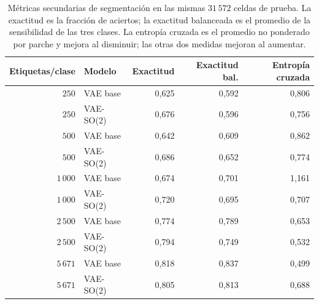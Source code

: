 \begin{table}[htbp]
    \centering
    \caption[Métricas secundarias de segmentación por presupuesto.]{Métricas secundarias de segmentación en las mismas \(31\,572\) celdas de prueba. La exactitud es la fracción de aciertos; la exactitud balanceada es el promedio de la sensibilidad de las tres clases. La entropía cruzada es el promedio no ponderado por parche y mejora al disminuir; las otras dos medidas mejoran al aumentar.}
    \label{tab:tejido-metricas-secundarias}
    \small
    \begin{tabular}{@{}rlrrr@{}}
        \toprule
        Etiquetas/clase & Modelo & Exactitud & Exactitud bal. & Entropía cruzada \\
        \midrule
        \(250\) & VAE base & 0,625 & 0,592 & 0,806 \\
        \(250\) & VAE-SO(2) & 0,676 & 0,596 & 0,756 \\
        \(500\) & VAE base & 0,642 & 0,609 & 0,862 \\
        \(500\) & VAE-SO(2) & 0,686 & 0,652 & 0,774 \\
        \(1\,000\) & VAE base & 0,674 & 0,701 & 1,161 \\
        \(1\,000\) & VAE-SO(2) & 0,720 & 0,695 & 0,707 \\
        \(2\,500\) & VAE base & 0,774 & 0,789 & 0,653 \\
        \(2\,500\) & VAE-SO(2) & 0,794 & 0,749 & 0,532 \\
        \(5\,671\) & VAE base & 0,818 & 0,837 & 0,499 \\
        \(5\,671\) & VAE-SO(2) & 0,805 & 0,813 & 0,688 \\
        \bottomrule
    \end{tabular}
\end{table}
